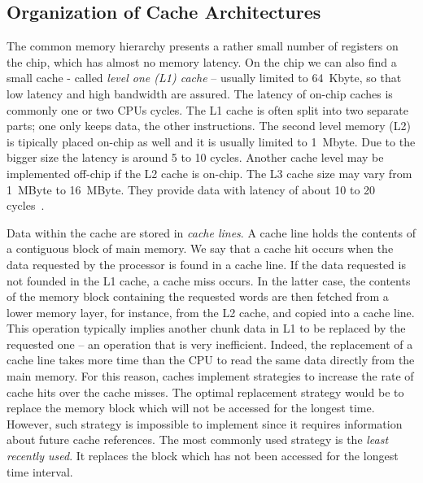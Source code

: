 \subsection{Organization of Cache Architectures}
The common memory hierarchy presents a rather small number of registers on the chip, which has almost no memory latency. On the chip we can also find a small cache - called \textit{level one (L1) cache} -- usually limited to 64~Kbyte, so that low latency and high bandwidth are assured. The latency of on-chip caches is commonly one or two CPUs cycles. The L1 cache is often split into two separate parts; one only keeps data, the other instructions. The second level memory (L2) is tipically placed on-chip as well and it is usually limited to 1~Mbyte. Due to the bigger size the  latency is around 5 to 10 cycles. Another cache level may be implemented off-chip if the L2 cache is on-chip. The L3 cache size may vary from 1~MByte to 16~MByte. They provide data with latency of about 10 to 20 cycles~\citep{Hennessy-Patterson}.

Data within the cache are stored in \textit{cache lines}. A cache line holds the contents of a contiguous block of main memory. We say that a cache hit occurs when the data requested by the processor is found in a cache line. If the data requested is not founded in the L1 cache, a cache miss occurs. In the latter case, the contents of the memory block containing the requested words are then fetched from a lower memory layer, for instance, from the L2 cache, and copied into a cache line. This operation typically implies another chunk data in L1 to be replaced by the requested one -- an operation that is very inefficient. Indeed, the replacement of a cache line takes more time than the CPU to read the same data directly from the main memory. For this reason, caches implement strategies to increase the rate of cache hits  over the cache misses. The optimal replacement strategy would be to replace the memory block which will not be accessed for the longest time. However, such strategy is impossible to implement since it requires information about future cache references. 
The most commonly used strategy is the \textit{least recently used}. It replaces the block which has not been accessed for the longest time interval.

 

